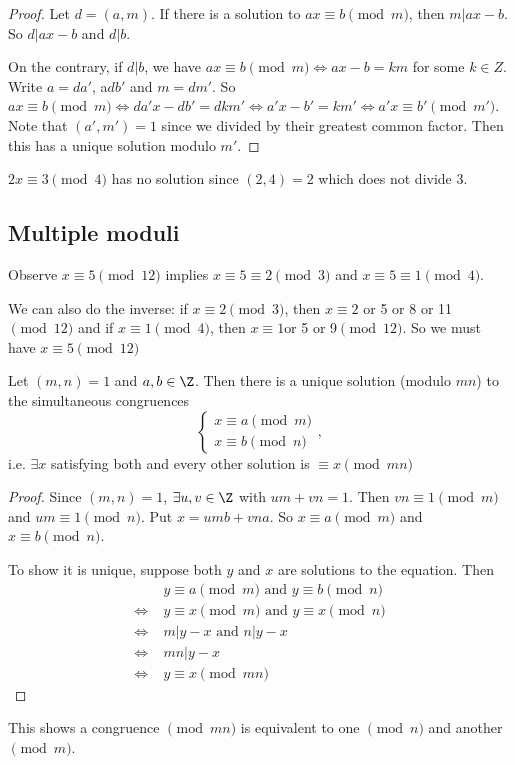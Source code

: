 \documentclass[a4paper]{article}
\begin{document}
  \begin{proof}
    Let $d = (a, m)$. If there is a solution to $ax \equiv b\pmod m$, then $m | ax - b$. So $d | ax - b$ and $d | b$.

    On the contrary, if $d | b$, we have $ax \equiv b\pmod m \Leftrightarrow ax - b = km$ for some $k\in Z$. Write $a = da'$, a$db'$ and $m = dm'$. So $ax\equiv b\pmod m \Leftrightarrow da'x - db' = dkm'\Leftrightarrow a'x - b' = km'\Leftrightarrow a'x \equiv b'\pmod {m'}$. Note that $(a', m') = 1$ since we divided by their greatest common factor. Then this has a unique solution modulo $m'$.
  \end{proof}

  \begin{eg}
    $2x \equiv 3 \pmod 4$ has no solution since $(2, 4) = 2$ which does not divide $3$.
  \end{eg}

  \subsection{Multiple moduli}
  Observe $x\equiv 5\pmod {12}$ implies $x\equiv 5\equiv 2 \pmod 3$ and $x\equiv 5\equiv 1\pmod 4$.

  We can also do the inverse: if $x \equiv 2\pmod 3$, then $x\equiv 2$ or 5 or 8 or 11 $\pmod {12}$ and if $x \equiv 1 \pmod 4$, then $x\equiv 1 $or 5 or 9$\pmod 12$. So we must have $x \equiv 5\pmod {12}$

  \begin{thm}
    Let $(m, n) = 1$ and $a, b\in \Z$. Then there is a unique solution (modulo $mn$) to the simultaneous congruences
    \[
      \begin{cases}x\equiv a\pmod m \\ x\equiv b\pmod n \end{cases},
    \]
    i.e. $\exists x$ satisfying both and every other solution is $\equiv x \pmod {mn}$
  \end{thm}

  \begin{proof}
    Since $(m, n) = 1$, $\exists u, v\in \Z$ with $um + vn = 1$. Then $vn \equiv 1\pmod m$ and $um \equiv 1 \pmod n$. Put $x = umb + vna$. So $x\equiv a\pmod m$ and $x\equiv b\pmod n$.

    To show it is unique, suppose both $y$ and $x$ are solutions to the equation. Then
    \begin{align*}
      &\; y \equiv a\pmod m \text{ and } y \equiv b\pmod n\\
      \Leftrightarrow &\; y \equiv x\pmod m \text{ and } y\equiv x\pmod n\\
      \Leftrightarrow &\; m | y - x\text{ and } n | y - x\\
      \Leftrightarrow &\; mn | y - x\\
      \Leftrightarrow &\; y \equiv x\pmod {mn}
    \end{align*}
  \end{proof}
  \note This shows a congruence $\pmod {mn}$  is equivalent to one $\pmod n$ and another $\pmod m$.
\end{document}

